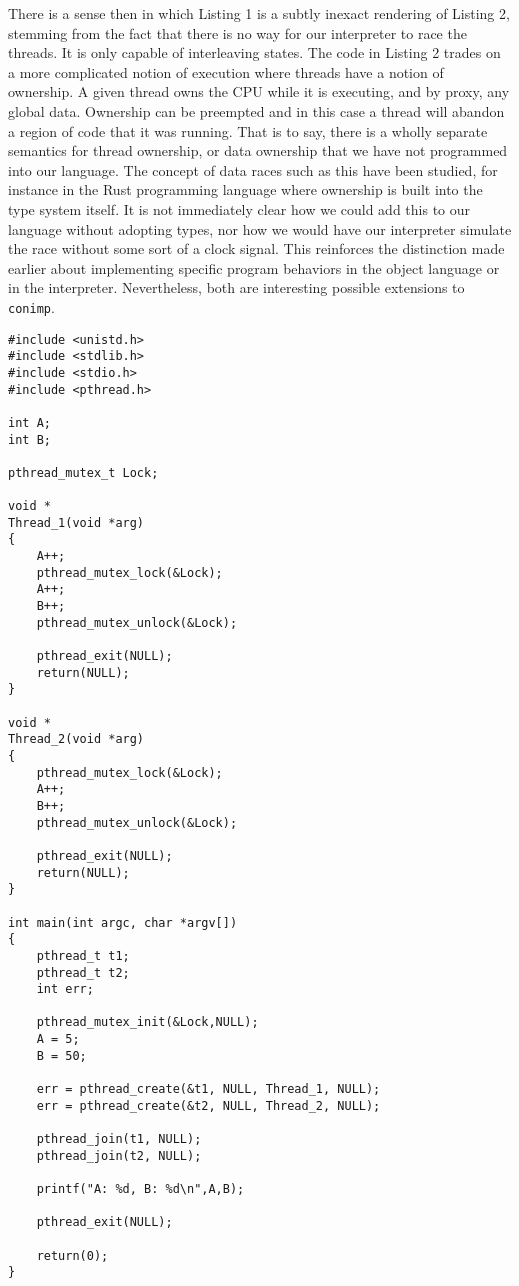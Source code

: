 There is a sense then in which Listing 1 is a subtly inexact rendering of Listing 2, stemming from the fact that there is no way for our interpreter to race the threads.  It is only capable of interleaving states.  The code in Listing 2 trades on a more complicated notion of execution where threads have a notion of ownership.  A given thread owns the CPU while it is executing, and by proxy, any global data.  Ownership can be preempted and in this case a thread will abandon a region of code that it was running.  That is to say, there is a wholly separate semantics for thread ownership, or data ownership that we have not programmed into our language.  The concept of data races such as this have been studied, for instance in the Rust programming language \citep{rust2018} where ownership is built into the type system itself.  It is not immediately clear how we could add this to our language without adopting types, nor how we would have our interpreter simulate the race without some sort of a clock signal.  This reinforces the distinction made earlier about implementing specific program behaviors in the object language or in the interpreter.  Nevertheless, both are interesting possible extensions to \texttt{conimp}.  

\begin{lstlisting}[caption={Two threads concurrently updating a global store (C).},captionpos=b,frame=single]
#include <unistd.h>
#include <stdlib.h>
#include <stdio.h>
#include <pthread.h>

int A;
int B;

pthread_mutex_t Lock;

void *
Thread_1(void *arg)
{
	A++;
	pthread_mutex_lock(&Lock);
	A++;
	B++;
	pthread_mutex_unlock(&Lock);

	pthread_exit(NULL);
	return(NULL);
}

void *
Thread_2(void *arg)
{
	pthread_mutex_lock(&Lock);
	A++;
	B++;
	pthread_mutex_unlock(&Lock);

	pthread_exit(NULL);
	return(NULL);
}

int main(int argc, char *argv[])
{
	pthread_t t1;
	pthread_t t2;
	int err;

	pthread_mutex_init(&Lock,NULL);
	A = 5;
	B = 50;

	err = pthread_create(&t1, NULL, Thread_1, NULL);
	err = pthread_create(&t2, NULL, Thread_2, NULL);

	pthread_join(t1, NULL);
	pthread_join(t2, NULL);

	printf("A: %d, B: %d\n",A,B);

	pthread_exit(NULL);

	return(0);
}
\end{lstlisting}

